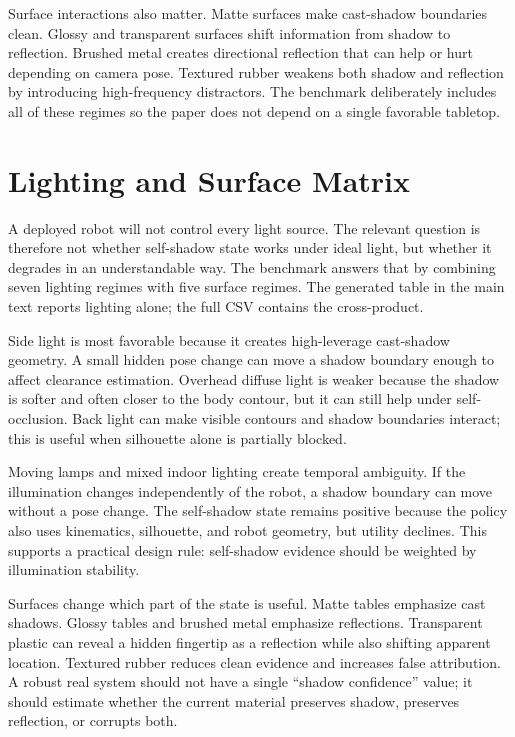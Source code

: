 \documentclass{article}
\begin{document}
Surface interactions also matter. Matte surfaces make cast-shadow boundaries clean. Glossy and transparent surfaces shift information from shadow to reflection. Brushed metal creates directional reflection that can help or hurt depending on camera pose. Textured rubber weakens both shadow and reflection by introducing high-frequency distractors. The benchmark deliberately includes all of these regimes so the paper does not depend on a single favorable tabletop.

\clearpage
\section{Lighting and Surface Matrix}

A deployed robot will not control every light source. The relevant question is therefore not whether self-shadow state works under ideal light, but whether it degrades in an understandable way. The benchmark answers that by combining seven lighting regimes with five surface regimes. The generated table in the main text reports lighting alone; the full CSV contains the cross-product.

Side light is most favorable because it creates high-leverage cast-shadow geometry. A small hidden pose change can move a shadow boundary enough to affect clearance estimation. Overhead diffuse light is weaker because the shadow is softer and often closer to the body contour, but it can still help under self-occlusion. Back light can make visible contours and shadow boundaries interact; this is useful when silhouette alone is partially blocked.

Moving lamps and mixed indoor lighting create temporal ambiguity. If the illumination changes independently of the robot, a shadow boundary can move without a pose change. The self-shadow state remains positive because the policy also uses kinematics, silhouette, and robot geometry, but utility declines. This supports a practical design rule: self-shadow evidence should be weighted by illumination stability.

Surfaces change which part of the state is useful. Matte tables emphasize cast shadows. Glossy tables and brushed metal emphasize reflections. Transparent plastic can reveal a hidden fingertip as a reflection while also shifting apparent location. Textured rubber reduces clean evidence and increases false attribution. A robust real system should not have a single ``shadow confidence'' value; it should estimate whether the current material preserves shadow, preserves reflection, or corrupts both.
\end{document}

